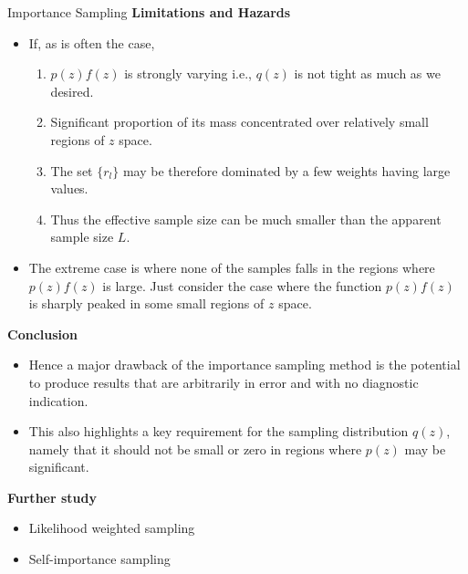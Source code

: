 \documentclass{bredelebeamer}
\begin{document}
\begin{frame}{Importance Sampling}
  \textbf{Limitations and Hazards}
  \begin{itemize}
    \item If, as is often the case,
    \begin{enumerate}
      \item $p(z)f(z)$ is strongly varying i.e., $q(z)$ is not tight as much
      as we desired.
      \item Significant proportion of its mass concentrated over relatively
      small regions of $z$ space.
      \item The set ${\{r_l\}}$ may be therefore dominated by a few weights
      having large values.
      \item Thus the effective sample size can be much smaller than the
      apparent sample size $L$.
    \end{enumerate}

    \item The extreme case is where none of the samples falls in the regions
    where $p(z)f(z)$ is large. Just consider the case where the function
    $p(z)f(z)$ is sharply peaked in some small regions of $z$ space.
  \end{itemize}

  \textbf{Conclusion}
  \begin{itemize}
    \item Hence a major drawback of the importance sampling method is the
    potential to produce results that are arbitrarily in error and with no
    diagnostic indication.
    \item This also highlights a key requirement for the sampling distribution
    $q(z)$, namely that it should not be small or zero in regions where $p(z)$
    may be significant.
  \end{itemize}

  \textbf{Further study}
  \begin{itemize}
    \item Likelihood weighted sampling
    \item Self-importance sampling
  \end{itemize}
\end{frame}
\end{document}
